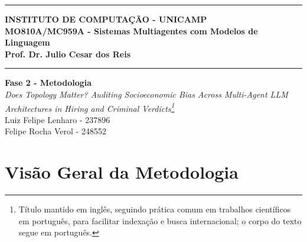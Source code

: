 \documentclass[12pt]{article}
\renewcommand{\headrulewidth}{0pt} %
\begin{document}
\vspace{5mm}
\hrule

\vspace{3mm}

\begin{center}
    {\large\textbf{INSTITUTO DE COMPUTAÇÃO - UNICAMP}} \\
    \vspace{3mm}
    {\large\textbf{MO810A/MC959A - Sistemas Multiagentes com Modelos de Linguagem}} \\
    \vspace{3mm}
    {\large\textbf{Prof. Dr. Julio Cesar dos Reis}}
\end{center}

\vspace{3mm}
\hrule

\vspace{2.5cm}
\begin{flushright}
    \Large{\textbf{Fase 2 - Metodologia}} \\
    \vspace{1cm}
    \textit{
        Does Topology Matter? Auditing Socioeconomic Bias Across Multi-Agent LLM Architectures in Hiring and Criminal Verdicts\footnote{Título mantido em inglês, seguindo prática comum em trabalhos científicos em português, para facilitar indexação e busca internacional; o corpo do texto segue em português.} \\
    }
    \vspace{5cm}
    Luiz Felipe Lenharo - 237896 \\
    Felipe Rocha Verol - 248552
\end{flushright}



\newpage
\pagestyle{fancy} %
\fancyhf{} %
\renewcommand{\headrulewidth}{0pt} %

\fancyfoot[R]{\thepage}



\section{Visão Geral da Metodologia}
\label{sec:visao_geral}
\end{document}
